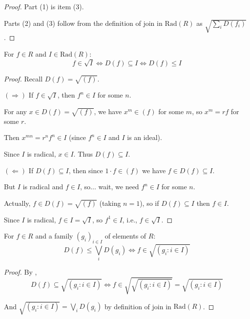 \begin{proof}
  \leanok
  Part (1) is  item (3).

  Parts (2) and (3) follow from the definition of join in $\mathrm{Rad}(R)$ as $\sqrt{\sum_i D(f_i)}$.
\end{proof}

\begin{lemma}
  \label{lemma:radical-membership-basic-open}
  \leanok
  For $f \in R$ and $I \in \mathrm{Rad}(R)$:
  $$f \in \sqrt{I} \iff D(f) \subseteq I \iff D(f) \leq I$$
\end{lemma}

\begin{proof}
  \leanok
  Recall $D(f) = \sqrt{(f)}$.

  $(\Rightarrow)$ If $f \in \sqrt{I}$, then $f^n \in I$ for some $n$.
  
  For any $x \in D(f) = \sqrt{(f)}$, we have $x^m \in (f)$ for some $m$, so $x^m = rf$ for some $r$.
  
  Then $x^{mn} = r^n f^n \in I$ (since $f^n \in I$ and $I$ is an ideal).
  
  Since $I$ is radical, $x \in I$. Thus $D(f) \subseteq I$.
  
  $(\Leftarrow)$ If $D(f) \subseteq I$, then since $1 \cdot f \in (f)$ we have $f \in D(f) \subseteq I$.
  
  But $I$ is radical and $f \in I$, so... wait, we need $f^n \in I$ for some $n$.
  
  Actually, $f \in D(f) = \sqrt{(f)}$ (taking $n=1$), so if $D(f) \subseteq I$ then $f \in I$.
  
  Since $I$ is radical, $f \in I = \sqrt{I}$, so $f^1 \in I$, i.e., $f \in \sqrt{I}$.
\end{proof}

\begin{lemma}
  \label{lemma:cover-criterion-basic-opens}
  \leanok
  For $f \in R$ and a family $(g_i)_{i \in I}$ of elements of $R$:
  $$D(f) \leq \bigvee_i D(g_i) \iff f \in \sqrt{(g_i : i \in I)}$$
\end{lemma}

\begin{proof}
  \leanok
  By ,
  $$D(f) \subseteq \sqrt{(g_i : i \in I)} \iff f \in \sqrt{\sqrt{(g_i : i \in I)}} = \sqrt{(g_i : i \in I)}$$

  And $\sqrt{(g_i : i \in I)} = \bigvee_i D(g_i)$ by definition of join in $\mathrm{Rad}(R)$.
\end{proof}

